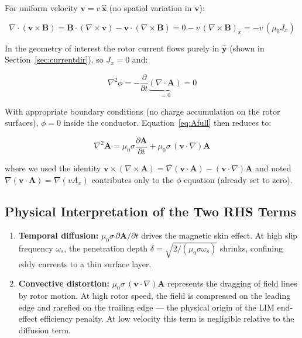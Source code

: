 \documentclass[12pt, a4paper]{article}
\theoremstyle{plain}
\theoremstyle{definition}
\newcommand{\vA}{\mathbf{A}}
\newcommand{\vB}{\mathbf{B}}
\newcommand{\vv}{\mathbf{v}}
\newcommand{\xhat}{\hat{\mathbf{x}}}
\newcommand{\yhat}{\hat{\mathbf{y}}}
\newcommand{\oms}{\omega_s}
\newcommand{\sig}{\sigma}
\newcommand{\muZ}{\mu_0}
\newcommand{\Der}[2]{\frac{\partial #1}{\partial #2}}
\begin{document}
For uniform velocity $\vv = v\,\xhat$ (no spatial variation in $\vv$):

\begin{equation}
  \nabla \cdot (\vv \times \vB) = \vB \cdot (\nabla \times \vv) - \vv \cdot (\nabla \times \vB)
  = 0 - v\,(\nabla \times \vB)_x = -v\,(\muZ J_x)
\end{equation}

In the geometry of interest the rotor current flows purely in $\yhat$ (shown in
Section~\ref{sec:currentdir}), so $J_x = 0$ and:

\begin{equation}
  \nabla^2\phi = -\frac{\partial}{\partial t}\underbrace{(\nabla \cdot \vA)}_{=0} = 0
\end{equation}

With appropriate boundary conditions (no charge accumulation on the rotor surfaces),
$\phi = 0$ inside the conductor. Equation~\eqref{eq:Afull} then reduces to:

\begin{tcolorbox}[colback=yellow!10, colframe=orange!60,
  title=\textbf{Convective Magnetic Diffusion Equation (CMDE)}]
\begin{equation}
  \boxed{
    \nabla^2 \vA = \muZ \sig \Der{\vA}{t} + \muZ \sig\,(\vv \cdot \nabla)\vA
  }
  \label{eq:cmde}
\end{equation}
\end{tcolorbox}

\noindent where we used the identity
$\vv \times (\nabla \times \vA) = \nabla(\vv \cdot \vA) - (\vv \cdot \nabla)\vA$
and noted $\nabla(\vv \cdot \vA) = \nabla(v A_x)$ contributes only to the $\phi$
equation (already set to zero).

\subsection{Physical Interpretation of the Two RHS Terms}

\begin{enumerate}[label=\textbf{\arabic*.}]
  \item \textbf{Temporal diffusion:} $\muZ\sig\,\partial\vA/\partial t$ drives the
        magnetic skin effect. At high slip frequency $\oms$, the penetration depth
        $\delta = \sqrt{2/(\muZ\sig\oms)}$ shrinks, confining eddy currents to a thin
        surface layer.
  \item \textbf{Convective distortion:} $\muZ\sig\,(\vv\cdot\nabla)\vA$ represents
        the dragging of field lines by rotor motion. At high rotor speed, the field
        is compressed on the leading edge and rarefied on the trailing edge — the
        physical origin of the LIM end-effect efficiency penalty. At low velocity this
        term is negligible relative to the diffusion term.
\end{enumerate}
\end{document}
